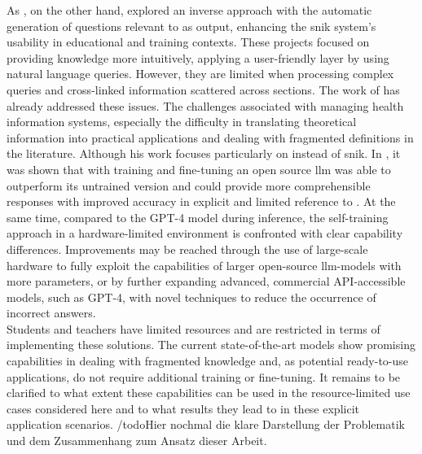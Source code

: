 As \citet{arneba}, on the other hand, explored an inverse approach with the automatic generation of questions relevant to \citep{snikquiz} as output, enhancing the \ac{snik} system's usability in educational and training contexts.
These projects focused on providing knowledge more intuitively, applying a user-friendly layer by using natural language queries.
%
However, they are limited when processing complex queries and cross-linked information scattered across sections.
The work of \citet{Paul_Keller} has already addressed these issues. 
The challenges associated with managing health information systems, especially the difficulty in translating theoretical information into practical applications and dealing with fragmented definitions in the literature.
Although his work focuses particularly on \citet{bb2} instead of \ac{snik}.
%
In \citet{Paul_Keller}, it was shown that with training and fine-tuning an open source \ac{llm} was able to outperform its untrained version and could provide more comprehensible responses with improved accuracy in explicit and limited reference to \citet{bb2}.
At the same time, compared to the GPT-4 model during inference, the self-training approach in a hardware-limited environment is confronted with clear capability differences.
%
Improvements may be reached through the use of large-scale hardware to fully exploit the capabilities of larger open-source \ac{llm}-models with more parameters, or by further expanding advanced, commercial API-accessible models, such as GPT-4, with novel techniques to reduce the occurrence of incorrect answers.\\
%
Students and teachers have limited resources and are restricted in terms of implementing these solutions.
The current state-of-the-art models show promising capabilities in dealing with fragmented knowledge and, as potential ready-to-use applications, do not require additional training or fine-tuning. 
It remains to be clarified to what extent these capabilities can be used in the resource-limited use cases considered here and to what results they lead to in these explicit application scenarios.
/todo{Hier nochmal die klare Darstellung der Problematik und dem Zusammenhang zum Ansatz dieser Arbeit.}
%

